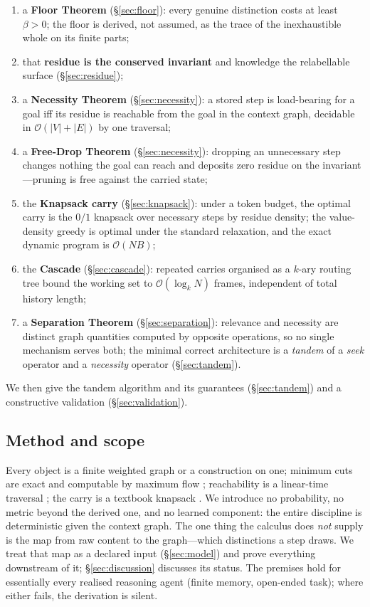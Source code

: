\documentclass[11pt,a4paper]{article}
\theoremstyle{thmstyle}
\theoremstyle{definition}
\theoremstyle{remark}
\newcommand{\Vrt}{V}
\newcommand{\Edg}{E}
\newcommand{\flo}{\beta}                %
\newcommand{\budget}{B}
\newcommand{\abs}[1]{\lvert#1\rvert}
\begin{document}
\begin{enumerate}[leftmargin=1.6em,itemsep=2pt]
\item a \textbf{Floor Theorem} (\S\ref{sec:floor}): every genuine distinction
costs at least $\flo>0$; the floor is derived, not assumed, as the trace of the
inexhaustible whole on its finite parts;
\item that \textbf{residue is the conserved invariant} and knowledge the
relabellable surface (\S\ref{sec:residue});
\item a \textbf{Necessity Theorem} (\S\ref{sec:necessity}): a stored step is
load-bearing for a goal iff its residue is reachable from the goal in the
context graph, decidable in $\mathcal{O}(\abs\Vrt+\abs\Edg)$ by one traversal;
\item a \textbf{Free-Drop Theorem} (\S\ref{sec:necessity}): dropping an
unnecessary step changes nothing the goal can reach and deposits zero residue on
the invariant---pruning is free against the carried state;
\item the \textbf{Knapsack carry} (\S\ref{sec:knapsack}): under a token budget,
the optimal carry is the $0/1$ knapsack over necessary steps by residue density;
the value-density greedy is optimal under the standard relaxation, and the exact
dynamic program is $\mathcal{O}(N\budget)$;
\item the \textbf{Cascade} (\S\ref{sec:cascade}): repeated carries organised as a
$k$-ary routing tree bound the working set to $\mathcal{O}(\log_k N)$ frames,
independent of total history length;
\item a \textbf{Separation Theorem} (\S\ref{sec:separation}): relevance and
necessity are distinct graph quantities computed by opposite operations, so no
single mechanism serves both; the minimal correct architecture is a
\emph{tandem} of a \emph{seek} operator and a \emph{necessity} operator
(\S\ref{sec:tandem}).
\end{enumerate}

We then give the tandem algorithm and its guarantees (\S\ref{sec:tandem}) and a
constructive validation (\S\ref{sec:validation}).

\subsection{Method and scope}

Every object is a finite weighted graph or a construction on one; minimum cuts
are exact and computable by maximum flow \citep{fordfulkerson1956,menger1927};
reachability is a linear-time traversal \citep{tarjan1972}; the carry is a
textbook knapsack \citep{dantzig1957,kellerer2004}. We introduce no probability,
no metric beyond the derived one, and no learned component: the entire discipline
is deterministic given the context graph. The one thing the calculus does
\emph{not} supply is the map from raw content to the graph---which distinctions a
step draws. We treat that map as a declared input (\S\ref{sec:model}) and prove
everything downstream of it; \S\ref{sec:discussion} discusses its status. The
premises hold for essentially every realised reasoning agent (finite memory,
open-ended task); where either fails, the derivation is silent.
\end{document}

